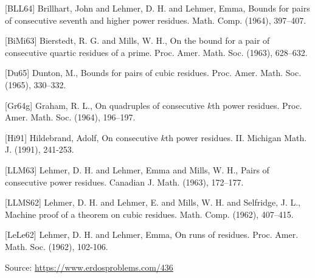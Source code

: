 \documentclass{article}
\begin{document}
[BLL64] Brillhart, John and Lehmer, D. H. and Lehmer, Emma, Bounds for pairs of consecutive seventh and higher power
residues. Math. Comp. (1964), 397--407.
 
 [BiMi63] Bierstedt, R. G. and Mills, W. H., On the bound for a pair of consecutive quartic residues of a
prime. Proc. Amer. Math. Soc. (1963), 628--632.
 
 [Du65] Dunton, M., Bounds for pairs of cubic residues. Proc. Amer. Math. Soc. (1965), 330--332.
 
 [Gr64g] Graham, R. L., On quadruples of consecutive {$k$}th power residues. Proc. Amer. Math. Soc. (1964), 196--197.
 
 [Hi91] Hildebrand, Adolf, On consecutive {$k$}th power residues. II. Michigan Math. J. (1991), 241-253.
 
 [LLM63] Lehmer, D. H. and Lehmer, Emma and Mills, W. H., Pairs of consecutive power residues. Canadian J. Math. (1963), 172--177.
 
 [LLMS62] Lehmer, D. H. and Lehmer, E. and Mills, W. H. and Selfridge,
J. L., Machine proof of a theorem on cubic residues. Math. Comp. (1962), 407--415.
 
 [LeLe62] Lehmer, D. H. and Lehmer, Emma, On runs of residues. Proc. Amer. Math. Soc. (1962), 102-106.

\bigskip
\noindent\small{Source: \url{https://www.erdosproblems.com/436}}
\end{document}
